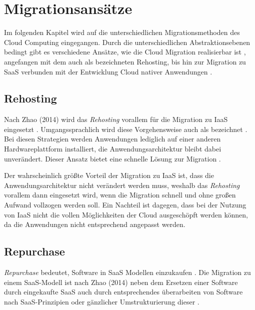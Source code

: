 \section{Migrationsansätze}
\label{sec:migrationsansaetze}


Im folgenden Kapitel wird auf die unterschiedlichen Migrationsmethoden des Cloud Computing eingegangen. Durch die unterschiedlichen Abstraktionsebenen bedingt gibt es verschiedene Ansätze, wie die Cloud Migration realisierbar ist \cite[Vgl.][S. 226]{Surianarayanan2019}, angefangen mit dem auch als \grqq{} bezeichneten Rehosting, bis hin zur Migration zu \ac{SaaS} verbunden mit der Entwicklung Cloud nativer Anwendungen \cite[Vgl.][S. 144]{Zhao2014}.

\subsection{Rehosting}
Nach Zhao (2014) wird das \textit{Rehosting} vorallem für die Migration zu \ac{IaaS} eingesetzt \cite[Vgl.][S. 144]{Zhao2014}. Umgangssprachlich wird diese Vorgehensweise auch als \grqq{} bezeichnet \cite[Vgl.][]{NetApp}. Bei diesen Strategien werden Anwendungen lediglich auf einer anderen Hardwareplattform installiert, die Anwendungsarchitektur bleibt dabei unverändert. Dieser Ansatz bietet eine schnelle Lösung zur Migration \cite[Vgl.][]{CIO}.

Der wahrscheinlich größte Vorteil der Migration zu \ac{IaaS} ist, dass die Anwendungsarchitektur nicht verändert werden muss, weshalb das \textit{Rehosting} vorallem dann eingesetzt wird, wenn die Migration schnell und ohne großen Aufwand vollzogen werden soll. Ein Nachteil ist dagegen, dass bei der Nutzung von \ac{IaaS} nicht die vollen Möglichkeiten der Cloud ausgeschöpft werden können, da die Anwendungen nicht entsprechend angepasst werden.

\subsection{Repurchase}
\textit{Repurchase} bedeutet, Software in \ac{SaaS} Modellen einzukaufen \cite[Vgl.][S. 2]{Ahmad2018}. Die Migration zu einem \ac{SaaS}-Modell ist nach Zhao (2014) neben dem Ersetzen einer Software durch eingekaufte \acs{SaaS} auch durch entsprechendes überarbeiten von Software nach \ac{SaaS}-Prinzipien oder gänzlicher Umstrukturierung dieser \cite[Vgl.][S. 144]{Zhao2014}. 

